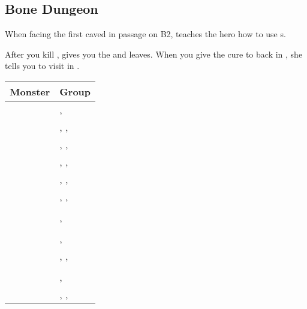 \subsection{Bone Dungeon}
\label{map:bone_dungeon}

When facing the first caved in passage on B2,  teaches the hero how to use s.

After you kill ,  gives you the  and leaves. When you give the cure to  back in , she tells you to visit  in .

\noindent\begin{tabularx}{\textwidth}[l]{lX}
	Monster & Group
\\ \hline
	\nameref{monster:basilisk}
	& \nameref{monster:basilisk}, \nameref{monster:basilisk} \\
	& \nameref{monster:basilisk}, \nameref{monster:basilisk}, \nameref{monster:poison_toad} \\
	& \nameref{monster:basilisk}, \nameref{monster:basilisk}, \nameref{monster:basilisk}
\\ \hline
	\nameref{monster:poison_toad}
	& \nameref{monster:poison_toad}, \nameref{monster:poison_toad}, \nameref{monster:mad_plant} \\
	& \nameref{monster:poison_toad}, \nameref{monster:poison_toad}, \nameref{monster:basilisk} \\
	& \nameref{monster:poison_toad}, \nameref{monster:poison_toad}, \nameref{monster:poison_toad}
\\ \hline
	\nameref{monster:sand_worm}
	& \nameref{monster:sand_worm} \\
	& \nameref{monster:sand_worm}, \nameref{monster:sand_worm}
\\ \hline
	\nameref{monster:skeleton}
	& \nameref{monster:skeleton} \\
	& \nameref{monster:skeleton}, \nameref{monster:skeleton} \\
	& \nameref{monster:skeleton}, \nameref{monster:skeleton}, \nameref{monster:skeleton}
\\ \hline
	\nameref{monster:roc}
	& \nameref{monster:roc} \\
	& \nameref{monster:roc}, \nameref{monster:roc} \\
	& \nameref{monster:roc}, \nameref{monster:roc}, \nameref{monster:roc}
\\ \hline

\end{tabularx}
